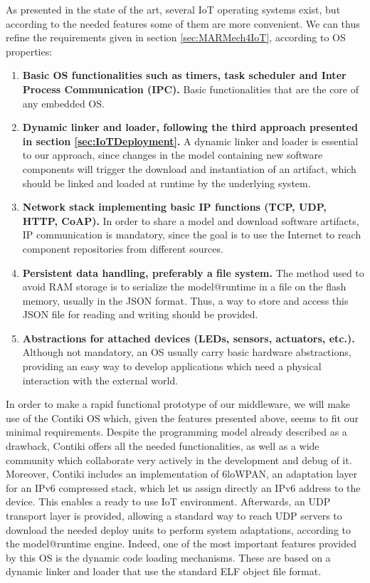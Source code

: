 As presented in the state of the art, several IoT operating systems exist, but according to the needed features some of them are more convenient.
We can thus refine the requirements given in section \ref{sec:MARMech4IoT}, according to OS properties:
\begin{enumerate}
	\item \textbf{Basic OS functionalities such as timers, task scheduler and Inter Process Communication (IPC).} Basic functionalities that are the core of any embedded OS.
	\item \textbf{Dynamic linker and loader, following the third approach presented in section \ref{sec:IoTDeployment}.} A dynamic linker and loader is essential to our approach, since changes in the model containing new software components will trigger the download and instantiation of an artifact, which should be linked and loaded at runtime by the underlying system.
	\item \textbf{Network stack implementing basic IP functions (TCP, UDP, HTTP, CoAP).} In order to share a model and download software artifacts, IP communication is mandatory, since the goal is to use the Internet to reach component repositories from different sources.
	\item \textbf{Persistent data handling, preferably a file system.} The method used to avoid RAM storage is to serialize the model@runtime in a file on the flash memory, usually in the JSON format. Thus, a way to store and access this JSON file for reading and writing should be provided.
	\item \textbf{Abstractions for attached devices (LEDs, sensors, actuators, etc.).} Although not mandatory, an OS usually carry basic hardware abstractions, providing an easy way to develop applications which need a physical interaction with the external world.
\end{enumerate}
In order to make a rapid functional prototype of our middleware, we will make use of the Contiki OS which, given the features presented above, seems to fit our minimal requirements.
Despite the programming model already described as a drawback, Contiki offers all the needed functionalities, as well as a wide community which collaborate very actively in the development and debug of it.
Moreover, Contiki includes an implementation of 6loWPAN\cite{rfc4944}, an adaptation layer for an IPv6 compressed stack, which let us assign directly an IPv6 address to the device.
This enables a ready to use IoT environment.
Afterwards, an UDP transport layer is provided, allowing a standard way to reach UDP servers to download the needed deploy units to perform system adaptations, according to the model@runtime engine.
Indeed, one of the most important features provided by this OS is the dynamic code loading mechanisms.
These are based on a dynamic linker and loader that use the standard ELF object file format\cite{dunkels06runtime}.


